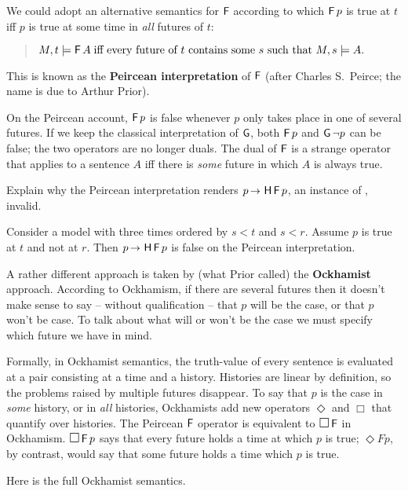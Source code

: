 
We could adopt an alternative semantics for $\operatorname{\mathsf{F}}$ according to which $\operatorname{\mathsf{F}} p$
is true at $t$ iff $p$ is true at some time in \emph{all} futures of $t$:
%
\begin{quote}
  $M,t \models \operatorname{\mathsf{F}} A \;\text{iff every future of $t$ contains some $s$ such that $M,s \models A$}.$
\end{quote}
This is known as the \textbf{Peircean interpretation} of $\operatorname{\mathsf{F}}$ (after
Charles S.\ Peirce; the name is due to Arthur Prior).

On the Peircean account, $\operatorname{\mathsf{F}} p$ is false whenever $p$ only takes place in one
of several futures. If we keep the classical interpretation of $\operatorname{\mathsf{G}}$, both
$\operatorname{\mathsf{F}} p$ and $\operatorname{\mathsf{G}} \neg p$ can be false; the two operators are no longer duals.
The dual of $\operatorname{\mathsf{F}}$ is a strange operator that applies to a sentence $A$ iff there
is \emph{some} future in which $A$ is always true.

\begin{exercise}
  Explain why the Peircean interpretation renders $p \to \tH\tF p$, an instance
  of , invalid.
\end{exercise}
\begin{solution}
  Consider a model with three times ordered by $s<t$ and $s<r$. Assume $p$ is true at $t$ and not at $r$. Then $p \to \tH\tF p$ is false on the Peircean interpretation.
\end{solution}

A rather different approach is taken by (what Prior called) the
\textbf{Ockhamist} approach. According to Ockhamism, if there are several
futures then it doesn't make sense to say -- without qualification -- that $p$
will be the case, or that $p$ won't be case. To talk about what will or won't be
the case we must specify which future we have in mind.

Formally, in Ockhamist semantics, the truth-value of every sentence is evaluated
at a pair consisting at a time and a history. Histories are linear by
definition, so the problems raised by multiple futures disappear. To say that
$p$ is the case in \emph{some} history, or in \emph{all} histories, Ockhamists
add new operators $\Diamond$ and $\Box$ that quantify over histories. The
Peircean $\operatorname{\mathsf{F}}$ operator is equivalent to $\Box \tF$ in Ockhamism. $\Box \tF p$
says that every future holds a time at which $p$ is true; $\Diamond Fp$, by
contrast, would say that some future holds a time which $p$ is true.

Here is the full Ockhamist semantics.

